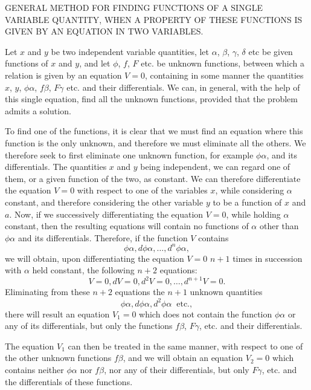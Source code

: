 \documentclass[12pt]{article}
\begin{document}
\begin{center}
GENERAL METHOD FOR FINDING FUNCTIONS OF A SINGLE VARIABLE QUANTITY, WHEN A PROPERTY OF THESE FUNCTIONS IS GIVEN BY AN EQUATION IN TWO VARIABLES.
\end{center}

Let $x$ and $y$ be two independent variable quantities, let $\alpha$, $\beta$, $\gamma$, $\delta$ etc be given functions of $x$ and $y$, and let $\phi$, $f$, $F$ etc. be unknown functions, between which a relation is given by an equation $V=0$, containing in some manner the quantities $x$, $y$, $\phi\alpha$, $f \beta$, $F\gamma$ etc. and their differentials.  We can, in general, with the help of this single equation, find all the unknown functions, provided that the problem admits a solution.  

To find one of the functions, it is clear that we must find an equation where this function is the only unknown, and therefore we must eliminate all the others.  We therefore seek to first eliminate one unknown function, for example $\phi\alpha$, and its differentials.  The quantities $x$ and $y$ being independent, we can regard one of them, or a given function of the two, as constant.  We can therefore differentiate the equation $V = 0$ with respect to one of the variables $x$, while considering $\alpha$ constant, and therefore considering the other variable $y$ to be a function of $x$ and $a$.  Now, if we successively differentiating the equation $V = 0$, while holding $\alpha$ constant, then the resulting equations will contain no functions of $\alpha$ other than $\phi \alpha$ and its differentials. Therefore, if the function $V$ contains
\[ \phi \alpha, d \phi \alpha, \dots, d^n\phi \alpha, \]
we will obtain, upon differentiating the equation $V=0$ $n+1$ times in succession with $\alpha$ held constant, the following $n+2$ equations:
\[ V = 0, dV = 0, d^2V = 0, \dots, d^{n+1} V = 0. \]
Eliminating from these $n+2$ equations the $n+1$ unknown quantities 
\[ \phi \alpha, d \phi \alpha, d^2 \phi \alpha \mathrm{\; \; etc.}, \]
there will result an equation $V_1 = 0$ which does not contain the function $\phi \alpha$ or any of its differentials, but only the functions $f\beta$, $F\gamma$, etc. and their differentials.  

The equation $V_1$ can then be treated in the same manner, with respect to one of the other unknown functions $f \beta$, and we will obtain an equation $V_2 = 0$ which contains neither $\phi \alpha$ nor $f \beta$, nor any of their differentials, but only $F\gamma$, etc. and the differentials of these functions.   
\end{document}
